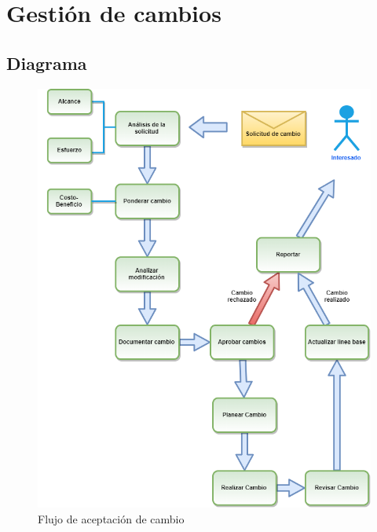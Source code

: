 \chapter{Gestión de cambios}
\section{Diagrama}
\begin{figure}[H]
    \centering
    \includegraphics[scale=0.50]{Files/gestCambios.png}
    \caption{Flujo de aceptación de cambio}
    \label{fig:clases}
\end{figure}

